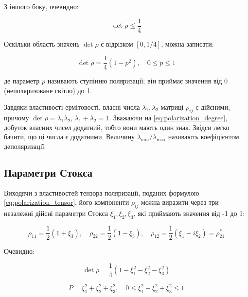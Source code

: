 З іншого боку, очевидно:

\begin{equation*}
\det \rho \leq \frac{1}{4}
\end{equation*}

Оскільки область значень \(\det \rho\) є відрізком \([0, 1/4]\), можна записати:

\begin{equation}
\det \rho = \frac{1}{4} \left( 1 - p^2 \right), \quad 0 \leq p \leq 1
\label{eq:polarization_degree}
\end{equation}

де параметр \(p\) називають ступінню поляризації; він приймає значення від 0 (неполяризоване світло) до 1.

Завдяки властивості ермітовості, власні числа \(\lambda_1, \lambda_2\) матриці \(\rho_{ij}\) є дійсними, причому \(\det \rho = \lambda_1 \lambda_2\),
\(\lambda_1 + \lambda_2 = 1\). Зважаючи на \eqref{eq:polarization_degree}, добуток власних чисел додатний, тобто вони мають один знак. Звідси легко
бачити, що ці числа є додатними. Величину \(\lambda_{\min}/\lambda_{\max}\) називають коефіцієнтом деполяризації.

\subsection*{Параметри Стокса}

Виходячи з властивостей тензора поляризації, поданих формулою \eqref{eq:polarization_tensor}, його компоненти \(\rho_{ij}\) можна виразити через три
незалежні дійсні параметри Стокса \(\xi_1, \xi_2, \xi_3\), які приймають значення від -1 до 1:

\begin{equation*}
\rho_{11} = \frac{1}{2} \left( 1 + \xi_3 \right), \quad \rho_{22} = \frac{1}{2} \left( 1 - \xi_3 \right), \quad \rho_{12} = \frac{1}{2} \left( \xi_1 -
i\xi_2 \right) = \rho_{21}^{*}
\end{equation*}

Очевидно:

\begin{equation*}
\det \rho = \frac{1}{4} \left( 1 - \xi_1^2 - \xi_2^2 - \xi_3^2 \right)
\end{equation*}

\begin{equation*}
P = \xi_1^2 + \xi_2^2 + \xi_3^2, \quad 0 \leq \xi_1^2 + \xi_2^2 + \xi_3^2 \leq 1
\end{equation*}

